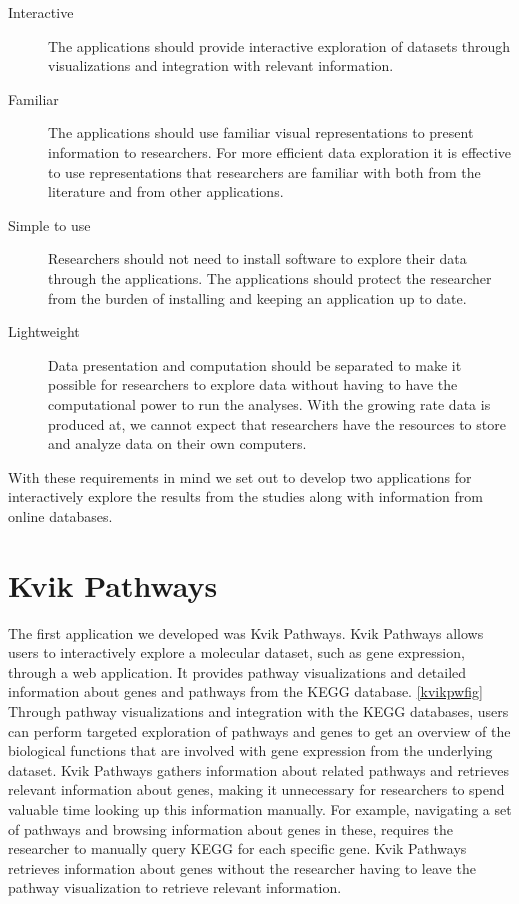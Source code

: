 \begin{description} 
\item[Interactive] The applications should provide interactive exploration
    of datasets through visualizations and integration with relevant
    information.
    
\item[Familiar] The applications should use familiar visual representations to
    present information to researchers. For more efficient data exploration it
        is effective to use representations that researchers are familiar with
        both from the literature and from other applications. 
    
\item[Simple to use] Researchers should not need to install software to
    explore their data through the applications. The applications should 
    protect the researcher from the burden of installing and keeping an
    application up to date. 
    
\item[Lightweight] Data presentation and computation should be separated
    to make it possible for researchers to explore data without having to
    have the computational power to run the analyses. With the growing rate
    data is produced at, we cannot expect that researchers have the resources to
    store and analyze data on their own computers. 
    
\end{description}

With these requirements in mind we set out to develop two applications for
interactively explore the results from the studies along with information
from online databases. 

\section{Kvik Pathways}
The first application we developed was Kvik Pathways. Kvik Pathways allows users
to interactively explore a molecular dataset, such as gene expression, through a
web application. It provides pathway visualizations and detailed information
about genes and pathways from the KEGG database. \ref{kvikpwfig} Through pathway
visualizations and integration with the KEGG databases, users can perform
targeted exploration of pathways and genes to get an overview of the biological
functions that are involved with gene expression from the underlying dataset.
Kvik Pathways gathers information about related pathways and retrieves relevant
information about genes, making it unnecessary for researchers to spend valuable
time looking up this information manually. For example, navigating a set of
pathways and browsing information about genes in these, requires the researcher
to manually query KEGG for each specific gene.  Kvik Pathways retrieves
information about genes without the researcher having to leave the pathway
visualization to retrieve relevant information.


